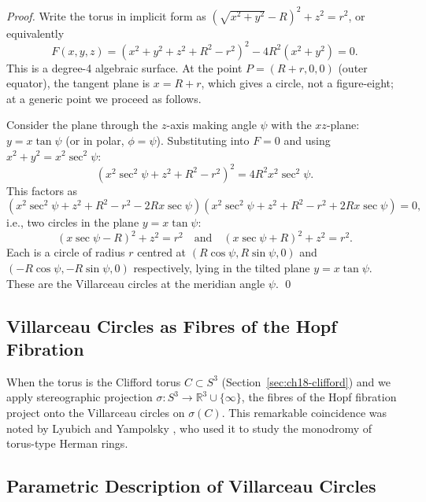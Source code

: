 \begin{proof}
Write the torus in implicit form as $(\sqrt{x^2+y^2} - R)^2 + z^2 = r^2$, or
equivalently
\begin{equation}\label{eq:torus-implicit}
  F(x,y,z) = (x^2 + y^2 + z^2 + R^2 - r^2)^2 - 4R^2(x^2+y^2) = 0.
\end{equation}
This is a degree-4 algebraic surface.
At the point $P = (R+r, 0, 0)$ (outer equator), the tangent plane is $x = R+r$,
which gives a circle, not a figure-eight; at a generic point we proceed as follows.

Consider the plane through the $z$-axis making angle $\psi$ with the $xz$-plane:
$y = x\tan\psi$ (or in polar, $\phi = \psi$).
Substituting into $F = 0$ and using $x^2+y^2 = x^2\sec^2\psi$:
\begin{equation}
  (x^2\sec^2\psi + z^2 + R^2 - r^2)^2 = 4R^2 x^2\sec^2\psi.
\end{equation}
This factors as
\begin{equation}
  (x^2\sec^2\psi + z^2 + R^2 - r^2 - 2Rx\sec\psi)(x^2\sec^2\psi + z^2 + R^2 - r^2 + 2Rx\sec\psi) = 0,
\end{equation}
i.e., two circles in the plane $y = x\tan\psi$:
\begin{equation}
  (x\sec\psi - R)^2 + z^2 = r^2 \quad\text{and}\quad (x\sec\psi + R)^2 + z^2 = r^2.
\end{equation}
Each is a circle of radius $r$ centred at $(R\cos\psi, R\sin\psi, 0)$ and
$(- R\cos\psi, -R\sin\psi, 0)$ respectively, lying in the tilted plane
$y = x\tan\psi$.
These are the Villarceau circles at the meridian angle $\psi$.
\qed
\end{proof}

\subsection{Villarceau Circles as Fibres of the Hopf Fibration}\label{subsec:ch18-villarceau-hopf}

When the torus is the Clifford torus $C \subset S^3$ (Section~\ref{sec:ch18-clifford})
and we apply stereographic projection $\sigma: S^3 \to \mathbb{R}^3 \cup \{\infty\}$,
the fibres of the Hopf fibration project onto the Villarceau circles on $\sigma(C)$.
This remarkable coincidence was noted by
Lyubich and Yampolsky \cite{LyubichYampolsky2011}, who used it to study
the monodromy of torus-type Herman rings.

\subsection{Parametric Description of Villarceau Circles}\label{subsec:ch18-villarceau-param}

